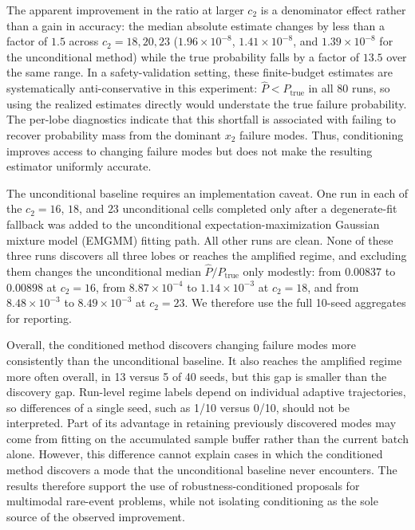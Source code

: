 \documentclass[twoside,11pt]{article}
\begin{document}
The apparent improvement in the ratio at larger $c_2$ is a denominator effect rather than a gain in accuracy: the median absolute estimate changes by less than a factor of $1.5$ across $c_2=18,20,23$ ($1.96\times10^{-8}$, $1.41\times10^{-8}$, and $1.39\times10^{-8}$ for the unconditional method) while the true probability falls by a factor of $13.5$ over the same range. In a safety-validation setting, these finite-budget estimates are systematically anti-conservative in this experiment: $\widehat P<P_{\mathrm{true}}$ in all 80 runs, so using the realized estimates directly would understate the true failure probability. The per-lobe diagnostics indicate that this shortfall is associated with failing to recover probability mass from the dominant $x_2$ failure modes. Thus, conditioning improves access to changing failure modes but does not make the resulting estimator uniformly accurate.

The unconditional baseline requires an implementation caveat. One run in each of the $c_2=16$, $18$, and $23$ unconditional cells completed only after a degenerate-fit fallback was added to the unconditional expectation-maximization Gaussian mixture model (EMGMM) fitting path. All other runs are clean. None of these three runs discovers all three lobes or reaches the amplified regime, and excluding them changes the unconditional median $\widehat P/P_{\mathrm{true}}$ only modestly: from $0.00837$ to $0.00898$ at $c_2=16$, from $8.87\times10^{-4}$ to $1.14\times10^{-3}$ at $c_2=18$, and from $8.48\times10^{-3}$ to $8.49\times10^{-3}$ at $c_2=23$. We therefore use the full 10-seed aggregates for reporting.

Overall, the conditioned method discovers changing failure modes more consistently than the unconditional baseline. It also reaches the amplified regime more often overall, in 13 versus 5 of 40 seeds, but this gap is smaller than the discovery gap. Run-level regime labels depend on individual adaptive trajectories, so differences of a single seed, such as 1/10 versus 0/10, should not be interpreted. Part of its advantage in retaining previously discovered modes may come from fitting on the accumulated sample buffer rather than the current batch alone. However, this difference cannot explain cases in which the conditioned method discovers a mode that the unconditional baseline never encounters. The results therefore support the use of robustness-conditioned proposals for multimodal rare-event problems, while not isolating conditioning as the sole source of the observed improvement.
\end{document}
